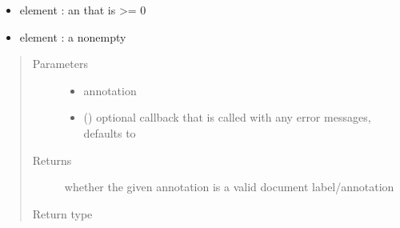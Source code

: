 \documentclass[letterpaper,10pt,english]{sphinxmanual}
\begin{document}
\begin{fulllineitems}
\begin{itemize}
\item {} 
element : an  that is \textgreater{}= 0

\item {} 
element : a non\sphinxhyphen{}empty 

\end{itemize}
\begin{quote}\begin{description}
\item[{Parameters}] \leavevmode\begin{itemize}
\item {} 
 \textendash{} annotation

\item {} 
 (\sphinxstyleliteralemphasis{\sphinxupquote{, }}) \textendash{} optional callback that is called with any error messages, defaults to 

\end{itemize}

\item[{Returns}] \leavevmode
whether the given annotation is a valid document label/annotation

\item[{Return type}] \leavevmode
{}

\end{description}\end{quote}

\end{fulllineitems}

\end{document}
